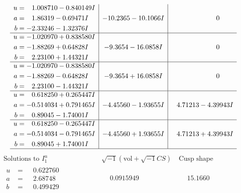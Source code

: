 \documentclass[1p]{elsarticle_modified}
\theoremstyle{definition}
\newcommand{\I}{\sqrt{-1}}
\begin{document}
$$\begin{array}{c|c|c}
\begin{aligned}
u &= \phantom{-}1.008710 - 0.840149 I \\
a &= \phantom{-}1.86319 - 0.69471 I \\
b &= -2.33246 - 1.32376 I\end{aligned}
 & -10.2365 - 10.1066 I & \phantom{-0.000000 } 0 \\ \hline\begin{aligned}
u &= -1.020970 + 0.838580 I \\
a &= -1.88269 + 0.64828 I \\
b &= \phantom{-}2.23100 + 1.44321 I\end{aligned}
 & -9.3654 - 16.0858 I & \phantom{-0.000000 } 0 \\ \hline\begin{aligned}
u &= -1.020970 - 0.838580 I \\
a &= -1.88269 - 0.64828 I \\
b &= \phantom{-}2.23100 - 1.44321 I\end{aligned}
 & -9.3654 + 16.0858 I & \phantom{-0.000000 } 0 \\ \hline\begin{aligned}
u &= \phantom{-}0.618250 + 0.265447 I \\
a &= -0.514034 + 0.791465 I \\
b &= \phantom{-}0.89045 - 1.74001 I\end{aligned}
 & -4.45560 - 1.93655 I & \phantom{-}4.71213 - 4.39943 I \\ \hline\begin{aligned}
u &= \phantom{-}0.618250 - 0.265447 I \\
a &= -0.514034 - 0.791465 I \\
b &= \phantom{-}0.89045 + 1.74001 I\end{aligned}
 & -4.45560 + 1.93655 I & \phantom{-}4.71213 + 4.39943 I\\
 \hline 
 \end{array}$$\newpage$$\begin{array}{c|c|c}  
\text{Solutions to }I^u_{1}& \I (\text{vol} + \sqrt{-1}CS) & \text{Cusp shape}\\
 \hline 
\begin{aligned}
u &= \phantom{-}0.622760\phantom{ +0.000000I} \\
a &= \phantom{-}2.68748\phantom{ +0.000000I} \\
b &= \phantom{-}0.499429\phantom{ +0.000000I}\end{aligned}
 & \phantom{-}0.0915949\phantom{ +0.000000I} & \phantom{-}15.1660\phantom{ +0.000000I} \\ \hline\begin{aligned}

\end{aligned}
\end{array}$$
\end{document}
